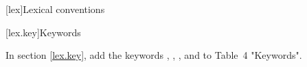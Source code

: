 
[lex]{Lexical conventions}

\setcounter{section}{11}
[lex.key]{Keywords}

In section \ref{lex.key}, add the keywords ,
, , and
 to Table~4 "Keywords".

